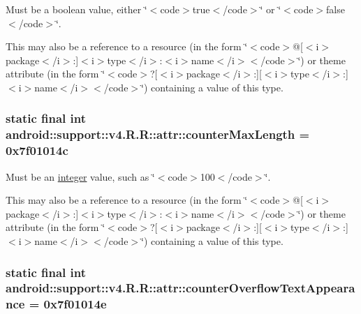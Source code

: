 Must be a boolean value, either \char`\"{}$<$code$>$true$<$/code$>$\char`\"{} or \char`\"{}$<$code$>$false$<$/code$>$\char`\"{}. 

This may also be a reference to a resource (in the form \char`\"{}$<$code$>$@\mbox{[}$<$i$>$package$<$/i$>$:\mbox{]}$<$i$>$type$<$/i$>$:$<$i$>$name$<$/i$>$$<$/code$>$\char`\"{}) or theme attribute (in the form \char`\"{}$<$code$>$?\mbox{[}$<$i$>$package$<$/i$>$:\mbox{]}\mbox{[}$<$i$>$type$<$/i$>$:\mbox{]}$<$i$>$name$<$/i$>$$<$/code$>$\char`\"{}) containing a value of this type. \hypertarget{classandroid_1_1support_1_1v4_1_1_r_1_1attr_ff77590d5bddcd0f541d103db1718747}{
\subsubsection[{counterMaxLength}]{\setlength{\rightskip}{0pt plus 5cm}static final int android::support::v4.R.R::attr::counterMaxLength = 0x7f01014c}}
\label{classandroid_1_1support_1_1v4_1_1_r_1_1attr_ff77590d5bddcd0f541d103db1718747}


Must be an \hyperlink{classandroid_1_1support_1_1v4_1_1_r_1_1integer}{integer} value, such as \char`\"{}$<$code$>$100$<$/code$>$\char`\"{}. 

This may also be a reference to a resource (in the form \char`\"{}$<$code$>$@\mbox{[}$<$i$>$package$<$/i$>$:\mbox{]}$<$i$>$type$<$/i$>$:$<$i$>$name$<$/i$>$$<$/code$>$\char`\"{}) or theme attribute (in the form \char`\"{}$<$code$>$?\mbox{[}$<$i$>$package$<$/i$>$:\mbox{]}\mbox{[}$<$i$>$type$<$/i$>$:\mbox{]}$<$i$>$name$<$/i$>$$<$/code$>$\char`\"{}) containing a value of this type. \hypertarget{classandroid_1_1support_1_1v4_1_1_r_1_1attr_14bd3fd4d1f6a0d2cb081c1976a24eb6}{
\subsubsection[{counterOverflowTextAppearance}]{\setlength{\rightskip}{0pt plus 5cm}static final int android::support::v4.R.R::attr::counterOverflowTextAppearance = 0x7f01014e}}
\label{classandroid_1_1support_1_1v4_1_1_r_1_1attr_14bd3fd4d1f6a0d2cb081c1976a24eb6}


